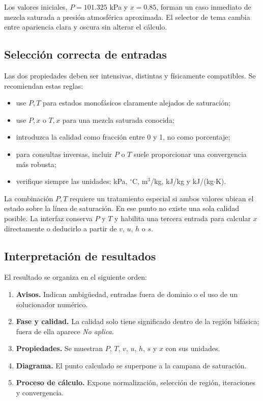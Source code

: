 \documentclass[11pt,a4paper,oneside]{article}
\begin{document}
Los valores iniciales, $P=101.325$ kPa y $x=0.85$, forman un caso inmediato de mezcla saturada a presi\'on atmosf\'erica aproximada. El selector de tema cambia entre apariencia clara y oscura sin alterar el c\'alculo.

\subsection{Selecci\'on correcta de entradas}

Las dos propiedades deben ser intensivas, distintas y f\'isicamente compatibles. Se recomiendan estas reglas:

\begin{itemize}
  \item use $P,T$ para estados monof\'asicos claramente alejados de saturaci\'on;
  \item use $P,x$ o $T,x$ para una mezcla saturada conocida;
  \item introduzca la calidad como fracci\'on entre 0 y 1, no como porcentaje;
  \item para consultas inversas, incluir $P$ o $T$ suele proporcionar una convergencia m\'as robusta;
  \item verifique siempre las unidades: kPa, $^\circ$C, m$^3$/kg, kJ/kg y kJ/(kg$\cdot$K).
\end{itemize}

La combinaci\'on $P,T$ requiere un tratamiento especial si ambos valores ubican el estado sobre la l\'inea de saturaci\'on. En ese punto no existe una sola calidad posible. La interfaz conserva $P$ y $T$ y habilita una tercera entrada para calcular $x$ directamente o deducirlo a partir de $v$, $u$, $h$ o $s$.

\subsection{Interpretaci\'on de resultados}

El resultado se organiza en el siguiente orden:

\begin{enumerate}
  \item \textbf{Avisos.} Indican ambigüedad, entradas fuera de dominio o el uso de un solucionador num\'erico.
  \item \textbf{Fase y calidad.} La calidad solo tiene significado dentro de la regi\'on bif\'asica; fuera de ella aparece \emph{No aplica}.
  \item \textbf{Propiedades.} Se muestran $P$, $T$, $v$, $u$, $h$, $s$ y $x$ con sus unidades.
  \item \textbf{Diagrama.} El punto calculado se superpone a la campana de saturaci\'on.
  \item \textbf{Proceso de c\'alculo.} Expone normalizaci\'on, selecci\'on de regi\'on, iteraciones y convergencia.
\end{enumerate}
\end{document}
